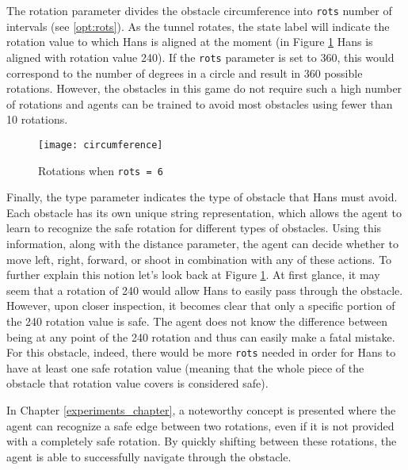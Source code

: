 The rotation parameter divides the obstacle circumference into \texttt{rots} number of intervals (see \ref{opt:rots}). As the tunnel rotates, the state label will indicate the rotation value to which Hans is aligned at the moment (in Figure \ref{fig:circumference} Hans is aligned with rotation value 240). If the \texttt{rots} parameter is set to 360, this would correspond to the number of degrees in a circle and result in 360 possible rotations. However, the obstacles in this game do not require such a high number of rotations and agents can be trained to avoid most obstacles using fewer than 10 rotations. 

\begin{figure}[h]
    \centering
    \texttt{[image: circumference]}
    \caption{Rotations when \texttt{rots = 6}}
    \label{fig:circumference}
\end{figure}

Finally, the type parameter indicates the type of obstacle that Hans must avoid. Each obstacle has its own unique string representation, which allows the agent to learn to recognize the safe rotation for different types of obstacles. Using this information, along with the distance parameter, the agent can decide whether to move left, right, forward, or shoot in combination with any of these actions. To further explain this notion let's look back at Figure \ref{fig:circumference}. At first glance, it may seem that a rotation of 240 would allow Hans to easily pass through the obstacle. However, upon closer inspection, it becomes clear that only a specific portion of the 240 rotation value is safe. The agent does not know the difference between being at any point of the 240 rotation and thus can easily make a fatal mistake. For this obstacle, indeed, there would be more \texttt{rots} needed in order for Hans to have at least one safe rotation value (meaning that the whole piece of the obstacle that rotation value covers is considered safe).

In Chapter \ref{experiments_chapter}, a noteworthy concept is presented where the agent can recognize a safe edge between two rotations, even if it is not provided with a completely safe rotation. By quickly shifting between these rotations, the agent is able to successfully navigate through the obstacle.

